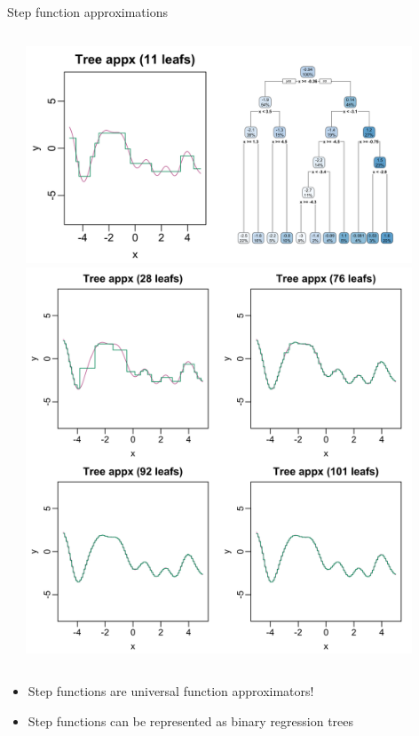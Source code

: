 \documentclass[aspectratio=199]{beamer}
\begin{document}
\begin{frame}{Step function approximations}
\begin{columns}
\begin{column}{0.15\textwidth}
\end{column}
\begin{column}{0.5\textwidth}
\begin{overprint}
\centering\includegraphics[width = 0.9\textwidth]{figures/treeapprx_cart}
\centering\includegraphics[width = 0.9\textwidth]{figures/tree_appx}
\end{overprint}
\end{column}
\end{columns}

\begin{itemize}
\item{Step functions are universal function approximators!}

\item{Step functions can be represented as binary regression trees}

\end{itemize}

\end{frame}
\end{document}
